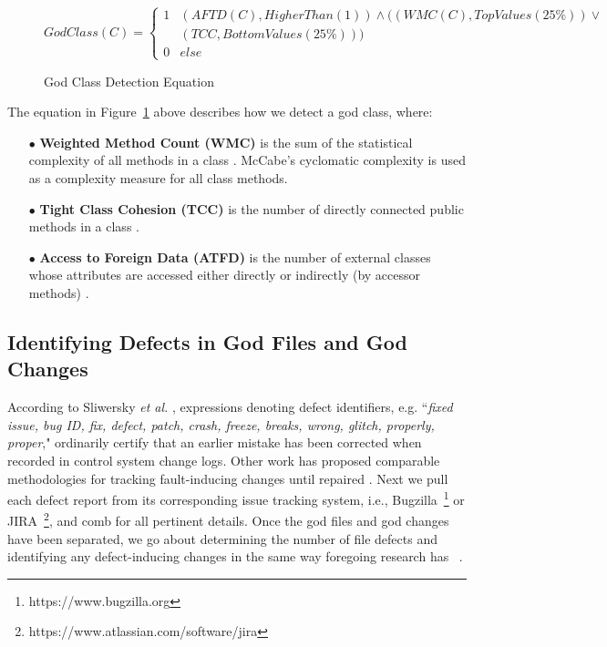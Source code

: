 \begin{figure}[h]
\[GodClass(C) = \left\{\begin{matrix}
1& (AFTD(C), HigherThan(1))  \wedge ((WMC(C), TopValues(25\%)) \vee \\ 
 & (TCC, BottomValues(25\%)))\\ 
0& else
\end{matrix}\right.\]
\captionsetup[figure]{list=no}
\caption{God Class Detection Equation}
\label{equation:1}
\end{figure}

The equation in Figure~\ref{equation:1} above describes how we detect a god class, where:


\begin{itemize}
\item[$\bullet$] \textbf{Weighted Method Count (WMC)} is the sum of the statistical complexity of all methods in a class \cite{Chidamber_Kemerer_94}. McCabe's cyclomatic complexity \cite{McCabe_1976} is used as a complexity measure for all class methods.
\item[$\bullet$] \textbf{Tight Class Cohesion (TCC)} is the number of directly connected public methods in a class \cite{Bieman:1995:CRO:223427.211856}.
\item[$\bullet$] \textbf{Access to Foreign Data (ATFD)} is the number of external classes whose attributes are accessed either directly or indirectly (by accessor methods) \cite{Marinescu_PhD}.
\end{itemize}

\subsection{Identifying Defects in God Files and God Changes}
\label{ch4_bugs_td}

According to Sliwersky \textit{et al.} \cite{sliwerski-msr-2005}, expressions denoting defect identifiers, e.g. ``\textit{fixed issue, bug ID, fix, defect, patch, crash, freeze, breaks, wrong, glitch, properly, proper}," ordinarily certify that an earlier mistake has been corrected when recorded in control system change logs. Other work has proposed comparable methodologies for tracking fault-inducing changes until repaired \cite{Kamei-tse-2013, Kim-tse-2008, sliwerski-msr-2005}. Next we pull each defect report from its corresponding issue tracking system, i.e., Bugzilla~\footnote{https://www.bugzilla.org} or JIRA~\footnote{https://www.atlassian.com/software/jira}, and comb for all pertinent details. \revision Once the god files and god changes have been separated, we go about determining the number of file defects and identifying any defect-inducing changes in the same way foregoing research has ~\cite{Kamei-tse-2013, Kim-tse-2008, sliwerski-msr-2005}.

